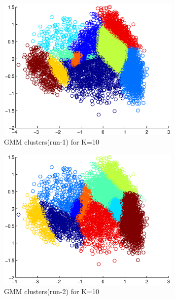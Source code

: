 \documentclass[a4paper]{article}
\begin{document}
\begin{enumerate}
		\begin{figure}[H]
			\begin{center}
				\includegraphics[width=0.8\textwidth]{GMM_K10.eps}
				\caption{GMM clusters(run-1) for K=10}\label{fig:gmm_k10}
			\end{center}
		\end{figure}
		
		\begin{figure}[H]
			\begin{center}
				\includegraphics[width=0.8\textwidth]{GMM_K10_1.eps}
				\caption{GMM clusters(run-2) for K=10}\label{fig:gmm_k10_1}
			\end{center}
		\end{figure}
		

\end{enumerate}
\end{document}
